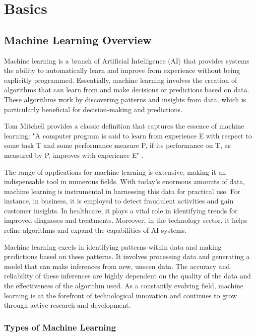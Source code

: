 \chapter{Basics}
\label{sec:basics}

\section{Machine Learning Overview}

Machine learning is a branch of Artificial Intelligence (AI) that provides systems the ability to automatically learn and improve from experience without being explicitly programmed. Essentially, machine learning involves the creation of algorithms that can learn from and make decisions or predictions based on data. These algorithms work by discovering patterns and insights from data, which is particularly beneficial for decision-making and predictions.

Tom Mitchell provides a classic definition that captures the essence of machine learning: "A computer program is said to learn from experience E with respect to some task T and some performance measure P, if its performance on T, as measured by P, improves with experience E" \cite[p. 2]{mitchell1997machine}.

The range of applications for machine learning is extensive, making it an indispensable tool in numerous fields. With today's enormous amounts of data, machine learning is instrumental in harnessing this data for practical use. For instance, in business, it is employed to detect fraudulent activities and gain customer insights. In healthcare, it plays a vital role in identifying trends for improved diagnoses and treatments. Moreover, in the technology sector, it helps refine algorithms and expand the capabilities of AI systems.

Machine learning excels in identifying patterns within data and making predictions based on these patterns. It involves processing data and generating a model that can make inferences from new, unseen data. The accuracy and reliability of these inferences are highly dependent on the quality of the data and the effectiveness of the algorithm used. As a constantly evolving field, machine learning is at the forefront of technological innovation and continues to grow through active research and development.


\subsection{Types of Machine Learning}

